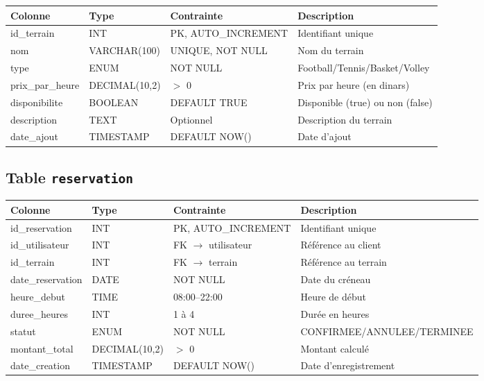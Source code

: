 \documentclass[12pt, a4paper]{report}
\begin{document}
\begin{center}
\begin{tabular}{>{\ttfamily\small}l >{\ttfamily\small}l >{\small}l >{\small}l}
\toprule
\normalfont Colonne & \normalfont Type & Contrainte & Description \\
\midrule
id\_terrain      & INT             & PK, AUTO\_INCREMENT & Identifiant unique \\
nom              & VARCHAR(100)    & UNIQUE, NOT NULL    & Nom du terrain \\
type             & ENUM            & NOT NULL            & Football/Tennis/Basket/Volley \\
prix\_par\_heure & DECIMAL(10,2)   & $>$ 0               & Prix par heure (en dinars) \\
disponibilite    & BOOLEAN         & DEFAULT TRUE        & Disponible (true) ou non (false) \\
description      & TEXT            & Optionnel           & Description du terrain \\
date\_ajout      & TIMESTAMP       & DEFAULT NOW()       & Date d'ajout \\
\bottomrule
\end{tabular}
\end{center}

\subsection{Table \texttt{reservation}}

\begin{center}
\begin{tabular}{>{\ttfamily\small}l >{\ttfamily\small}l >{\small}l >{\small}l}
\toprule
\normalfont Colonne & \normalfont Type & Contrainte & Description \\
\midrule
id\_reservation   & INT            & PK, AUTO\_INCREMENT & Identifiant unique \\
id\_utilisateur   & INT            & FK $\to$ utilisateur & Référence au client \\
id\_terrain       & INT            & FK $\to$ terrain    & Référence au terrain \\
date\_reservation & DATE           & NOT NULL            & Date du créneau \\
heure\_debut      & TIME           & 08:00–22:00         & Heure de début \\
duree\_heures     & INT            & 1 à 4               & Durée en heures \\
statut            & ENUM           & NOT NULL            & CONFIRMEE/ANNULEE/TERMINEE \\
montant\_total    & DECIMAL(10,2)  & $>$ 0               & Montant calculé \\
date\_creation    & TIMESTAMP      & DEFAULT NOW()       & Date d'enregistrement \\
\bottomrule
\end{tabular}
\end{center}
\end{document}
